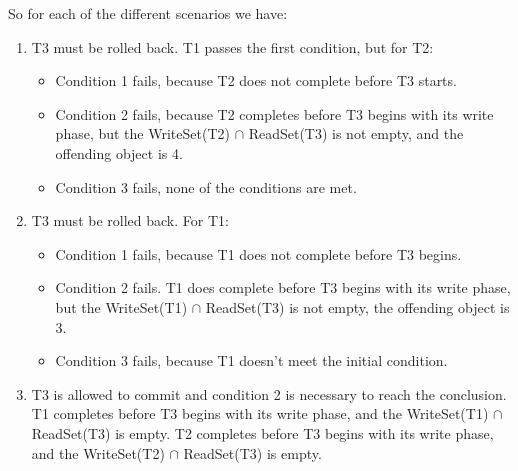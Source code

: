 \documentclass[11pt]{article}
\begin{document}
So for each of the different scenarios we have:
\begin{enumerate}
		\item
		T3 must be rolled back. T1 passes the first condition, but for T2:
			\begin{itemize}
				\item
				Condition 1 fails, because T2 does not complete before T3 starts.
				\item
				Condition 2 fails, because T2 completes before T3 begins with its write phase, but the 
				WriteSet(T2) $\cap$ ReadSet(T3) is not empty, and the offending object is 4.
				\item
				Condition 3 fails, none of the conditions are met.
			\end{itemize}
		
		\item
		T3 must be rolled back. For T1:
			\begin{itemize}
				\item
				Condition 1 fails, because T1 does not complete before T3 begins.
				\item
				Condition 2 fails. T1 does complete before T3 begins with its write phase, but the 
				WriteSet(T1) $\cap$ ReadSet(T3) is not empty, the offending object is 3.
				\item
				Condition 3 fails, because T1 doesn't meet the initial condition.
			\end{itemize}				
		
		\item
		T3 is allowed to commit and condition 2 is necessary to reach the conclusion. T1 completes before T3 
		begins with its write phase, and the WriteSet(T1) $\cap$ ReadSet(T3) is empty. T2 completes 
		before T3 begins with its write phase, and the WriteSet(T2) $\cap$ ReadSet(T3) is empty.			
	
\end{enumerate}
 
\end{document}
